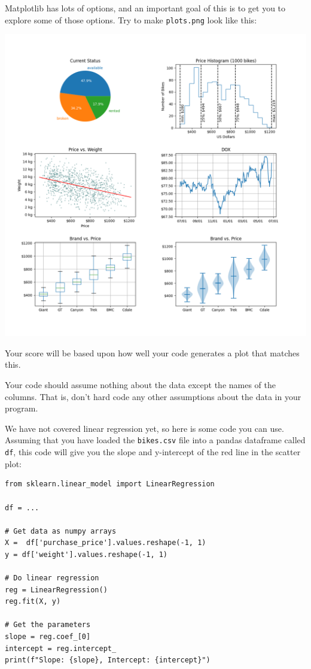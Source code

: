 \documentclass[11pt,english]{article}
\begin{document}
Matplotlib has lots of options,  and an important goal of this is to get you to explore some of those options.   Try to make \texttt{plots.png} look like this:

\includegraphics[width=\textwidth]{target.png}

Your score will be based upon how well your code generates a plot that matches this.

Your code should assume nothing about the data except the names of the columns.   That is, don't hard code any other assumptions about the data in your program.

We have not covered linear regression yet, so here is some code you can use.  Assuming that you have loaded the \texttt{bikes.csv} file into a pandas dataframe called \texttt{df}, this code will give you the slope and y-intercept of the red line in the scatter plot:

\begin{verbatim}
from sklearn.linear_model import LinearRegression

df = ...

# Get data as numpy arrays
X =  df['purchase_price'].values.reshape(-1, 1)
y = df['weight'].values.reshape(-1, 1)

# Do linear regression
reg = LinearRegression()
reg.fit(X, y) 

# Get the parameters
slope = reg.coef_[0]
intercept = reg.intercept_
print(f"Slope: {slope}, Intercept: {intercept}")
\end{verbatim}
\end{document}
